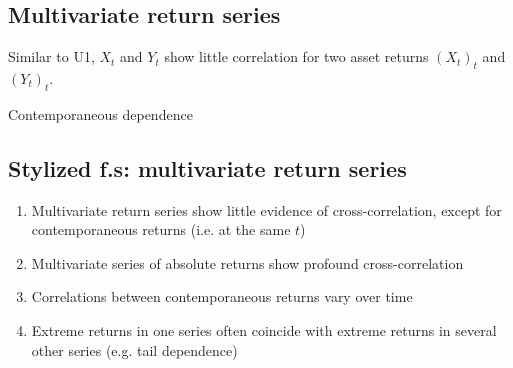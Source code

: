 \subsection*{Multivariate return series}
Similar to U1, $X_t$ and $Y_t$ show little correlation for two asset returns $(X_t)_t$ and $(Y_t)_t$.

Contemporaneous dependence

\subsection*{Stylized f.s: multivariate return series}
\begin{enumerate}[label=(M\arabic*),itemsep=5pt,leftmargin=1cm]
    \item Multivariate return series show little evidence of cross-correlation, except for contemporaneous returns (i.e. at the same $t$)
    \item Multivariate series of absolute returns show profound cross-correlation
    \item Correlations between contemporaneous returns vary over time
    \item Extreme returns in one series often coincide with extreme returns in several other series (e.g. tail dependence)
\end{enumerate}